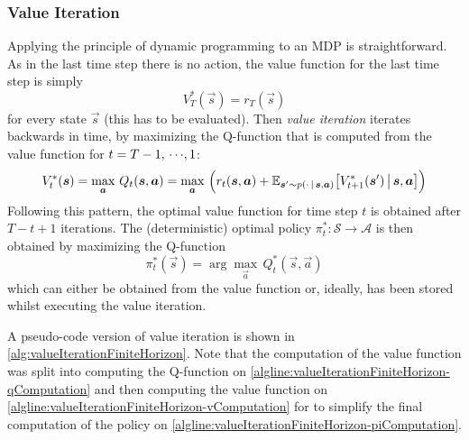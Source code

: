 			\subsubsection{Value Iteration}
				Applying the principle of dynamic programming to an MDP is straightforward. As in the last time step there is no action, the value function for the last time step is simply
				\begin{equation*}
					V_T^\ast(\vec{s}) = r_T(\vec{s})
				\end{equation*}
				for every state \(\vec{s}\) (this has to be evaluated). Then \emph{value iteration} iterates backwards in time, by maximizing the Q-function that is computed from the value function for \( t = T - 1,\,\cdots\!,1 \):
				\begin{equation*}
					V_t^\ast(\bm{s}) = \max_{\bm{a}} \, Q_t(\bm{s}, \bm{a}) = \max_{\bm{a}} \, \Big( r_t(\bm{s}, \bm{a}) + \mathbb{E}_{\bm{s}' \sim p(\cdot \,\vert\, \bm{s}, \bm{a})}\big[ V_{t + 1}^\ast(\bm{s}') \,\big\vert\, \bm{s}, \bm{a} \big] \Big)
				\end{equation*}
				Following this pattern, the optimal value function for time step \(t\) is obtained after \( T - t + 1 \) iterations. The (deterministic) optimal policy \( \pi_t^\ast : \mathcal{S} \to \mathcal{A} \) is then obtained by maximizing the Q-function
				\begin{equation*}
					\pi_t^\ast(\vec{s}) = \arg\max_{\vec{a}} \, Q_t^\ast(\vec{s}, \vec{a})
				\end{equation*}
				which can either be obtained from the value function or, ideally, has been stored whilst executing the value iteration.

				A pseudo-code version of value iteration is shown in \autoref{alg:valueIterationFiniteHorizon}. Note that the computation of the value function was split into computing the Q-function on \autoref{algline:valueIterationFiniteHorizon-qComputation} and then computing the value function on \autoref{algline:valueIterationFiniteHorizon-vComputation} for to simplify the final computation of the policy on \autoref{algline:valueIterationFiniteHorizon-piComputation}.

